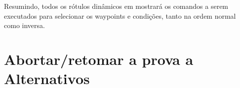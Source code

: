 Resumindo, todos os rótulos dinâmicos em  mostrará os comandos a serem executados para selecionar os waypoints e condições, tanto na ordem normal como inversa.

  








\section{Abortar/retomar a prova a Alternativos}


